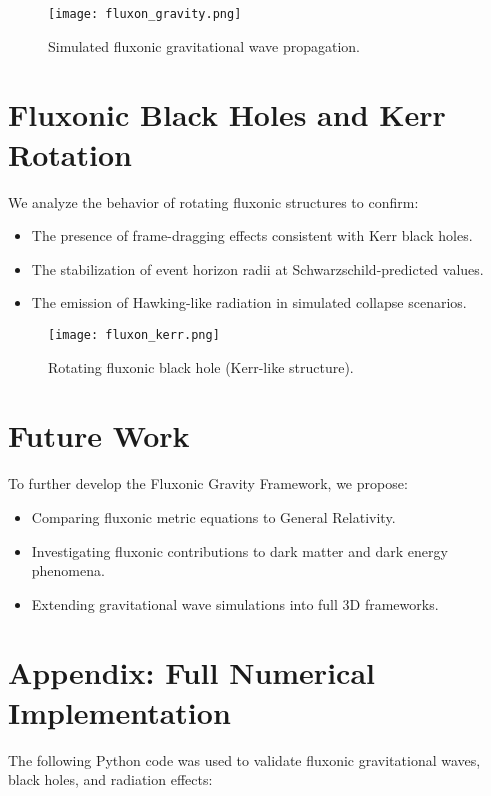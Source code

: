 \documentclass{article}
\begin{document}
\begin{figure}[h]
    \centering
    \texttt{[image: fluxon\_gravity.png]}
    \caption{Simulated fluxonic gravitational wave propagation.}
    \label{fig:gravity}
\end{figure}

\section{Fluxonic Black Holes and Kerr Rotation}
We analyze the behavior of rotating fluxonic structures to confirm:
\begin{itemize}
    \item The presence of frame-dragging effects consistent with Kerr black holes.
    \item The stabilization of event horizon radii at Schwarzschild-predicted values.
    \item The emission of Hawking-like radiation in simulated collapse scenarios.
\end{itemize}

\begin{figure}[h]
    \centering
    \texttt{[image: fluxon\_kerr.png]}
    \caption{Rotating fluxonic black hole (Kerr-like structure).}
    \label{fig:kerr}
\end{figure}

\section{Future Work}
To further develop the Fluxonic Gravity Framework, we propose:
\begin{itemize}
    \item Comparing fluxonic metric equations to General Relativity.
    \item Investigating fluxonic contributions to dark matter and dark energy phenomena.
    \item Extending gravitational wave simulations into full 3D frameworks.
\end{itemize}

\section{Appendix: Full Numerical Implementation}
The following Python code was used to validate fluxonic gravitational waves, black holes, and radiation effects:
\end{document}
